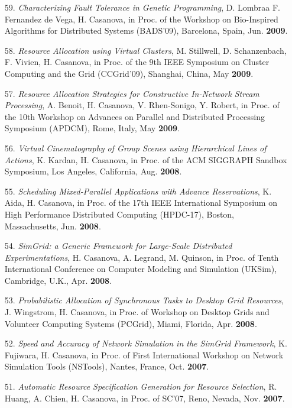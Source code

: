 \begin{enumerate}
\item[59.] {\it Characterizing Fault Tolerance in Genetic Programming},
D. Lombraa F. Fernandez de Vega, H. Casanova, in Proc. of the
Workshop on Bio-Inspired Algorithms for Distributed Systems (BADS'09),
Barcelona, Spain, Jun. {\bf 2009}. 

\item[58.] {\it Resource Allocation using Virtual Clusters}, M. Stillwell,
D. Schanzenbach, F. Vivien, H. Casanova, in Proc. of the 9th IEEE
Symposium on Cluster Computing and the Grid (CCGrid'09), Shanghai, China,
May {\bf 2009}.

\item[57.] {\it  Resource Allocation Strategies for Constructive In-Network
Stream Processing}, A. Benoit, H. Casanova, V. Rhen-Sonigo, Y. Robert, in
Proc. of the 10th Workshop on Advances on Parallel and Distributed
Processing Symposium (APDCM), Rome, Italy, May {\bf 2009}.

\item[56.] {\it Virtual Cinematography of Group Scenes using Hierarchical Lines
of Actions}, K. Kardan, H. Casanova, in Proc. of the ACM SIGGRAPH Sandbox
Symposium, Los Angeles, California, Aug. {\bf 2008}.

\item[55.] {\it Scheduling Mixed-Parallel Applications with Advance
Reservations}, K. Aida, H. Casanova, in Proc. of the 17th IEEE
International Symposium on High Performance Distributed Computing
(HPDC-17), Boston, Massachusetts, Jun. {\bf 2008}.

\item[54.] {\it SimGrid: a Generic Framework for Large-Scale Distributed Experimentations}, H. Casanova, A. Legrand, M. Quinson, in Proc. of Tenth International Conference on Computer Modeling and Simulation (UKSim), Cambridge, U.K., Apr. {\bf 2008}.

\item[53.] {\it Probabilistic Allocation of Synchronous Tasks to Desktop Grid
Resources}, J. Wingstrom, H. Casanova, in Proc. of Workshop on Desktop
Grids and Volunteer Computing Systems (PCGrid), Miami, Florida, Apr. {\bf
2008}.

\item[52.] {\it Speed and Accuracy of Network Simulation in the SimGrid
Framework}, K. Fujiwara, H. Casanova, in Proc. of First International
Workshop on Network Simulation Tools (NSTools), Nantes, France, Oct. {\bf
2007}.

\item[51.] {\it Automatic Resource Specification Generation for Resource
Selection},  R. Huang, A. Chien, H. Casanova, in Proc. of SC'07, Reno,
Nevada, Nov. {\bf 2007}.


\end{enumerate}
